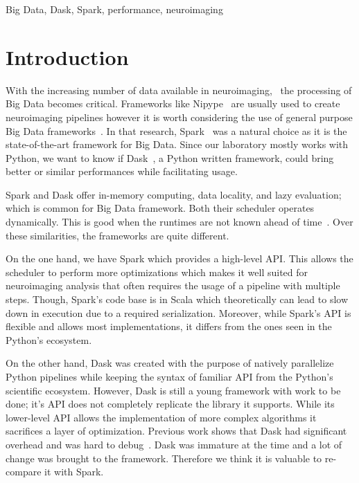 \documentclass[conference]{IEEEtran}
\begin{document}
\begin{IEEEkeywords}
Big Data, Dask, Spark, performance, neuroimaging
\end{IEEEkeywords}

\section{Introduction}
With the increasing number of data available in neuroimaging,~\cite{ALFAROALMAGRO:18,
UKBioBank:18} the processing of Big Data becomes critical. Frameworks like
Nipype~\cite{Nipype:11} are usually used to create neuroimaging pipelines however it
is worth considering the use of general purpose Big Data
frameworks~\cite{Hayot-Sasson:17}. In that research, Spark~\cite{Spark:16} was a
natural choice as it is the state-of-the-art framework for Big Data. Since our
laboratory mostly works with Python, we want to know if Dask~\cite{Dask:15}, a Python
written framework, could bring better or similar performances while facilitating
usage.

Spark and Dask offer in-memory computing, data locality, and lazy evaluation; which
is common for Big Data framework. Both their scheduler operates dynamically. This is
good when the runtimes are not known ahead of time~\cite{Dask:15}. Over these
similarities, the frameworks are quite different.

On the one hand, we have Spark which provides a high-level API. This allows the
scheduler to perform more optimizations which makes it well suited for neuroimaging
analysis that often requires the usage of a pipeline with multiple steps. Though,
Spark's code base is in Scala which theoretically can lead to slow down in execution
due to a required serialization. Moreover, while Spark's API is flexible and allows
most implementations, it differs from the ones seen in the Python's ecosystem.

On the other hand, Dask was created with the purpose of natively parallelize Python
pipelines while keeping the syntax of familiar API from the Python's scientific
ecosystem. However, Dask is still a young framework with work to be done; it's API
does not completely replicate the library it supports. While its lower-level API
allows the implementation of more complex algorithms it sacrifices a layer of
optimization.
Previous work shows that Dask had significant overhead and was
hard to debug~\cite{Mehta:17}.
Dask was immature at the time and a lot of change was brought to the framework.
Therefore we think it is valuable to re-compare it with Spark.
\end{document}
